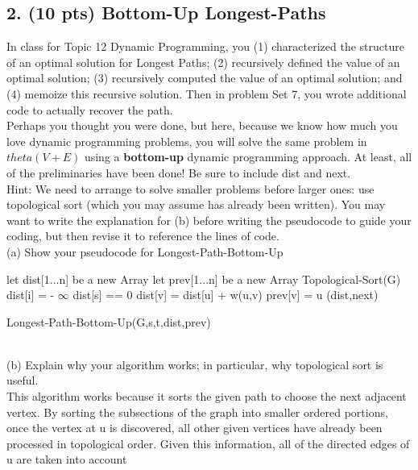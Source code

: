 \documentclass[12pt]{article}
\begin{document}
\subsection*{2. (10 pts) Bottom-Up Longest-Paths}
\linebreak
In class for Topic 12 Dynamic Programming, you (1) characterized the structure of an optimal solution for Longest Paths; (2) recursively defined the value of an optimal solution; (3) recursively computed the value of an optimal solution; and (4) memoize this recursive solution. Then in problem Set 7, you wrote additional code to actually recover the path. \\
\linebreak
Perhaps you thought you were done, but here, because we know how much you love dynamic programming problems, you will solve the same problem in $theta(V+E)$ using a \textbf{bottom-up} dynamic programming approach. At least, all of the preliminaries have been done! Be sure to include dist and next. \\
\linebreak
Hint: We need to arrange to solve smaller problems before larger ones: use topological sort (which you may assume has already been written). You may want to write the explanation for (b) before writing the pseudocode to guide your coding, but then revise it to reference the lines of code. \\
\linebreak
(a) Show your pseudocode for Longest-Path-Bottom-Up \\
\linebreak
\begin{algorithm}[H]
\SetAlgoLined
let dist[1...n] be a new Array\;
let prev[1...n] be a new Array\;
Topological-Sort(G) \;
{
dist[i] = - $\infty$ \;
}
\EndFor
dist[s] == 0 \;
{
{
{
dist[v] = dist[u] + w(u,v)\;
prev[v] = u \;
}
}
\EndFor
}
\EndFor
\Return (dist,next) \;
 \caption{Longest-Path-Bottom-Up(G,s,t,dist,prev)}
\end{algorithm} \\
\linebreak
(b) Explain why your algorithm works; in particular, why topological sort is useful. \\
\linebreak
This algorithm works because it sorts the given path to choose the next adjacent vertex.  By sorting the subsections of the graph into smaller ordered portions, once the vertex at u is discovered, all other given vertices have already been processed in topological order. Given this information, all of the directed edges of u are taken into account \\
\end{document}
